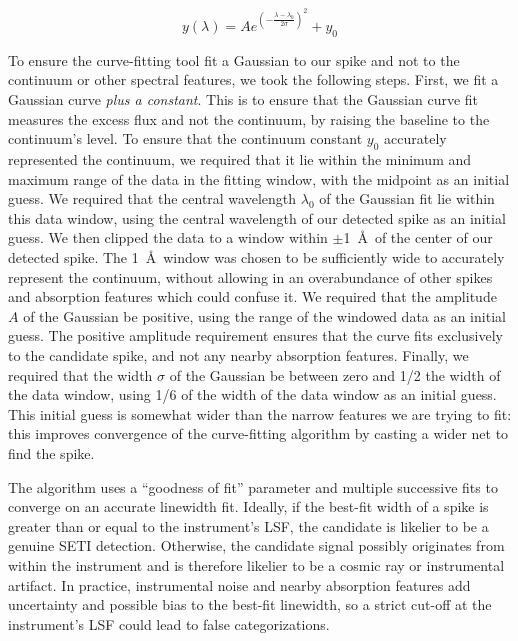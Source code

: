 \documentclass[twocolumn]{aastex701}
\begin{document}
\begin{equation}
    y(\lambda) = A e^{\left(- \frac{\lambda - \lambda_0}{2 \sigma}\right)^2}+y_0
    \label{eq:fit}
\end{equation}

To ensure the curve-fitting tool fit a Gaussian to our spike and not to the continuum or other spectral features, we took the following steps.  First, we fit a Gaussian curve \emph{plus a constant}. This is to ensure that the Gaussian curve fit measures the excess flux and not the continuum, by raising the baseline to the continuum's level. To ensure that the continuum constant $y_0$ accurately represented the continuum, we required that it lie within the minimum and maximum range of the data in the fitting window, with the midpoint as an initial guess. We required that the central wavelength $\lambda_0$ of the Gaussian fit lie within this data window, using the central wavelength of our detected spike as an initial guess. We then clipped the data to a window within $\pm$1~\AA~of the center of our detected spike. The 1~\AA~window was chosen to be sufficiently wide to accurately represent the continuum, without allowing in an overabundance of other spikes and absorption features which could confuse it. %
We required that the amplitude $A$ of the Gaussian be positive, using the range of the windowed data as an initial guess. The positive amplitude requirement ensures that the curve fits exclusively to the candidate spike, and not any nearby absorption features. Finally, we required that the width $\sigma$ of the Gaussian be between zero and 1/2 the width of the data window, using 1/6 of the width of the data window as an initial guess.  This initial guess is somewhat wider than the narrow features we are trying to fit: this improves convergence of the curve-fitting algorithm by casting a wider net to find the spike.

The algorithm uses a \enquote{goodness of fit} parameter and multiple successive fits to converge on an accurate linewidth fit. Ideally, if the best-fit width of a spike is greater than or equal to the instrument's LSF, the candidate is likelier to be a genuine SETI detection. Otherwise, the candidate signal possibly originates from within the instrument and is therefore likelier to be a cosmic ray or instrumental artifact. In practice, instrumental noise and nearby absorption features add uncertainty and possible bias to the best-fit linewidth, so a strict cut-off at the instrument's LSF could lead to false categorizations.
\end{document}
